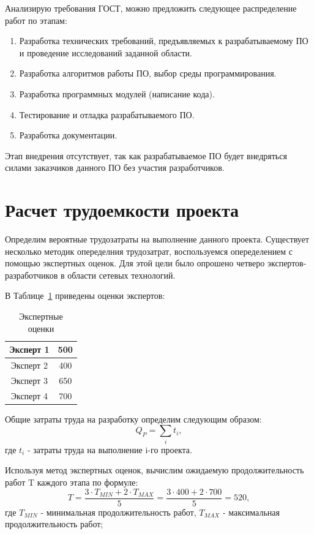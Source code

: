 Анализирую требования ГОСТ, можно предложить следующее распределение работ по этапам:
\begin{enumerate}[1.]
\item Разработка технических требований, предъявляемых к разрабатываемому ПО и проведение исследований заданной области.
\item Разработка алгоритмов работы ПО, выбор среды программирования.
\item Разработка программных модулей (написание кода).
\item Тестирование и отладка разрабатываемого ПО.
\item Разработка документации.
\end{enumerate}

Этап внедрения отсутствует, так как разрабатываемое ПО будет внедряться силами заказчиков данного ПО без участия разработчиков.

\section{Расчет трудоемкости проекта}
Определим вероятные трудозатраты на выполнение данного проекта. Существует несколько методик опеределния трудозатрат, воспользуемся опеределением с помощью экспертных оценок. Для этой цели было опрошено четверо экспертов-разработчиков в области сетевых технологий.

В Таблице~\ref{table:expert_marks} приведены оценки экспертов:

\begin{table}
\centering
\caption{Экспертные оценки}
\label{table:expert_marks}
\begin{tabular} {| c | c |} 
\hline
Эксперт 1 & 500\\
\hline
Эксперт 2 & 400\\
\hline
Эксперт 3 & 650\\
\hline
Эксперт 4 & 700\\
\hline
\end{tabular}
\end{table}

Общие затраты труда на разработку определим следующим образом:
\begin{equation}
Q_{P} = \sum_{i}t_i,
\end{equation}
где $t_{i}$ - затраты труда на выполнение i-го проекта.

Используя метод экспертных оценок, вычислим ожидаемую продолжительность работ T каждого этапа по формуле:
\begin{equation}
T = \frac{3 \cdot T_{MIN} + 2 \cdot T_{MAX}} {5} = \frac{3 \cdot 400 + 2 \cdot 700} {5} = 520,
\end{equation}
где $T_{MIN}$ - минимальная продолжительность работ, $T_{MAX}$ - максимальная продолжительность работ;

